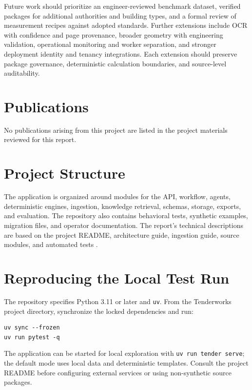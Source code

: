 Future work should prioritize an engineer-reviewed benchmark dataset, verified packages for additional authorities and building types, and a formal review of measurement recipes against adopted standards. Further extensions include OCR with confidence and page provenance, broader geometry with engineering validation, operational monitoring and worker separation, and stronger deployment identity and tenancy integrations. Each extension should preserve package governance, deterministic calculation boundaries, and source-level auditability.

\section*{Publications}
No publications arising from this project are listed in the project materials reviewed for this report.

\appendix
\section{Project Structure}
The application is organized around modules for the API, workflow, agents, deterministic engines, ingestion, knowledge retrieval, schemas, storage, exports, and evaluation. The repository also contains behavioral tests, synthetic examples, migration files, and operator documentation. The report's technical descriptions are based on the project README, architecture guide, ingestion guide, source modules, and automated tests \cite{tenderworks2026}.

\section{Reproducing the Local Test Run}
The repository specifies Python 3.11 or later and \texttt{uv}. From the Tenderworks project directory, synchronize the locked dependencies and run:
\begin{lstlisting}[basicstyle=\ttfamily\small,frame=single]
uv sync --frozen
uv run pytest -q
\end{lstlisting}
The application can be started for local exploration with \texttt{uv run tender serve}; the default mode uses local data and deterministic templates. Consult the project README before configuring external services or using non-synthetic source packages.
